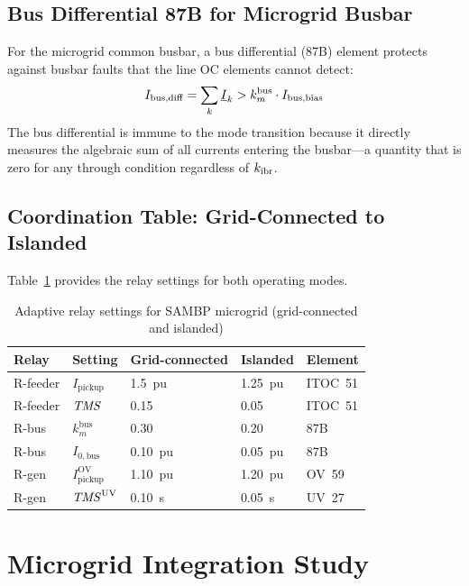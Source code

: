 \subsection{Bus Differential 87B for Microgrid Busbar}

For the microgrid common busbar, a bus differential (87B) element protects
against busbar faults that the line OC elements cannot detect:
\begin{equation}
  I_\mathrm{bus,diff} = \sum_{k} \underline{I}_k > k_m^\mathrm{bus} \cdot I_\mathrm{bus,bias}
  \label{eq:ch6_87b}
\end{equation}
The bus differential is immune to the mode transition because it directly
measures the algebraic sum of all currents entering the busbar—a quantity
that is zero for any through condition regardless of $k_\mathrm{ibr}$.

\subsection{Coordination Table: Grid-Connected to Islanded}

Table~\ref{tab:ch6_settings} provides the relay settings for both
operating modes.

\begin{table}[htbp]
\caption{Adaptive relay settings for SAMBP microgrid (grid-connected and islanded)}
\label{tab:ch6_settings}
\begin{tabularx}{\textwidth}{@{}lXXXl@{}}
\toprule
Relay & Setting & Grid-connected & Islanded & Element \\
\midrule
R-feeder & $I_\mathrm{pickup}$ & 1.5~pu & 1.25~pu & ITOC~51 \\
R-feeder & $\mathit{TMS}$ & 0.15 & 0.05 & ITOC~51 \\
R-bus & $k_m^\mathrm{bus}$ & 0.30 & 0.20 & 87B \\
R-bus & $I_{0,\mathrm{bus}}$ & 0.10~pu & 0.05~pu & 87B \\
R-gen & $I_\mathrm{pickup}^\mathrm{OV}$ & 1.10~pu & 1.20~pu & OV~59 \\
R-gen & $\mathit{TMS}^\mathrm{UV}$ & 0.10~s & 0.05~s & UV~27 \\
\bottomrule
\end{tabularx}
\end{table}

\section{Microgrid Integration Study}
\label{sec:ch6_integration}

